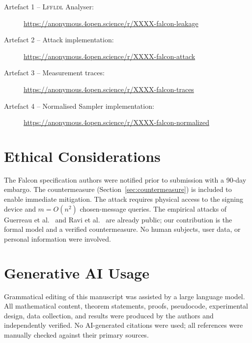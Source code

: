 \documentclass[sigconf,anonymous]{acmart}
\begin{document}
\begin{description}
  \item[Artefact 1 -- \textsc{Lffldl} Analyser:]
    \url{https://anonymous.4open.science/r/XXXX-falcon-leakage}
  \item[Artefact 2 -- Attack implementation:]
    \url{https://anonymous.4open.science/r/XXXX-falcon-attack}
  \item[Artefact 3 -- Measurement traces:]
    \url{https://anonymous.4open.science/r/XXXX-falcon-traces}
  \item[Artefact 4 -- Normalised Sampler implementation:]
    \url{https://anonymous.4open.science/r/XXXX-falcon-normalized}
\end{description}

\section{Ethical Considerations}

The Falcon specification authors were notified prior to submission with a
90-day embargo.  The countermeasure (Section~\ref{sec:countermeasure}) is
included to enable immediate mitigation.  The attack requires physical access
to the signing device and $m=O(n^2)$ chosen-message queries.  The empirical
attacks of Guerreau et al.~\cite{guerreau2022} and Ravi et
al.~\cite{ravi2023} are already public; our contribution is the formal model
and a verified countermeasure.  No human subjects, user data, or personal
information were involved.

\section{Generative AI Usage}

Grammatical editing of this manuscript was assisted by a large language model.
All mathematical content, theorem statements, proofs, pseudocode, experimental
design, data collection, and results were produced by the authors and
independently verified.  No AI-generated citations were used; all references
were manually checked against their primary sources.
\end{document}
